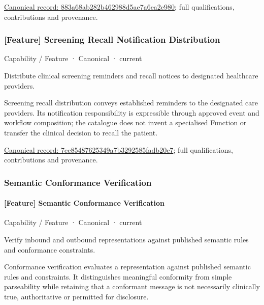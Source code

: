 {\footnotesize \href{../../../../continuum/strategy/capability/feature/883a68ab282b462988d5ae7a6ea2e980.md}{Canonical record: 883a68ab282b462988d5ae7a6ea2e980}; full qualifications, contributions and provenance.}\par
\subsubsection{[Feature] Screening Recall Notification Distribution}

\label{element:7ec85487625349a7b3292585fadb20c7}
{\small Capability / Feature · Canonical · current}\par

Distribute clinical screening reminders and recall notices to designated healthcare providers.



Screening recall distribution conveys established reminders to the designated care providers. Its notification responsibility is expressible through approved event and workflow composition; the catalogue does not invent a specialised Function or transfer the clinical decision to recall the patient.


{\footnotesize \href{../../../../continuum/strategy/capability/feature/7ec85487625349a7b3292585fadb20c7.md}{Canonical record: 7ec85487625349a7b3292585fadb20c7}; full qualifications, contributions and provenance.}\par
\subsubsection{Semantic Conformance Verification}

\paragraph{[Feature] Semantic Conformance Verification}

\label{element:d170a68efcae4aa59350f565ca69443a}
{\small Capability / Feature · Canonical · current}\par

Verify inbound and outbound representations against published semantic rules and conformance constraints.



Conformance verification evaluates a representation against published semantic rules and constraints. It distinguishes meaningful conformity from simple parseability while retaining that a conformant message is not necessarily clinically true, authoritative or permitted for disclosure.


